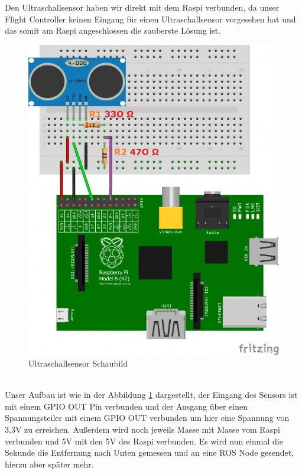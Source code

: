 Den Ultraschallsensor haben wir direkt mit dem Raspi verbunden, da unser Flight Controller keinen Eingang für einen Ultraschallsensor vorgesehen hat und das somit am Raspi angeschlossen die sauberste Lösung ist.
\begin{figure}[h]
	\centering
	\includegraphics[scale=0.3]{"Grafiken/Ultraschallsensor.png"}
	\caption{Ultraschallsensor Schaubild\protect\footnotemark}
	\label{fig:ultraschall}
\end{figure}
\\
Unser Aufbau ist wie in der Abbildung \ref{fig:ultraschall} dargestellt, der Eingang des Sensors ist mit einem GPIO OUT Pin verbunden und der Ausgang über einen Spannungsteiler mit einem GPIO OUT verbunden um hier eine Spannung von 3,3V zu erreichen. Außerdem wird noch jeweils Masse mit Masse vom Raspi verbunden und 5V mit den 5V des Raspi verbunden. Es wird nun einmal die Sekunde die Entfernung nach Unten gemessen und an eine ROS Node gesendet, hierzu aber später mehr.
\\


